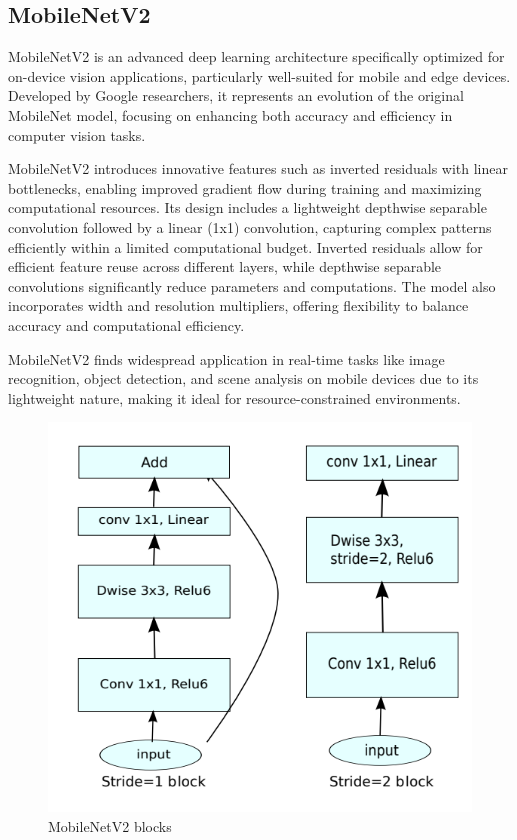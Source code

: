 \documentclass[runningheads,a4paper,11pt]{report}
\begin{document}
\subsection{MobileNetV2}

MobileNetV2 is an advanced deep learning architecture specifically optimized for on-device vision applications, particularly well-suited for mobile and edge devices. Developed by Google researchers, it represents an evolution of the original MobileNet model, focusing on enhancing both accuracy and efficiency in computer vision tasks.

MobileNetV2 introduces innovative features such as inverted residuals with linear bottlenecks, enabling improved gradient flow during training and maximizing computational resources. Its design includes a lightweight depthwise separable convolution followed by a linear (1x1) convolution, capturing complex patterns efficiently within a limited computational budget. Inverted residuals allow for efficient feature reuse across different layers, while depthwise separable convolutions significantly reduce parameters and computations. The model also incorporates width and resolution multipliers, offering flexibility to balance accuracy and computational efficiency. 

MobileNetV2 finds widespread application in real-time tasks like image recognition, object detection, and scene analysis on mobile devices due to its lightweight nature, making it ideal for resource-constrained environments.
\begin{figure}[h]
    \centering
    \includegraphics[scale=0.5]{images/mobilenetv2.png} 
    \caption{MobileNetV2 blocks }
\end{figure}
\end{document}
